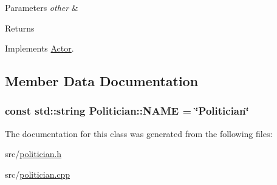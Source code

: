 \begin{DoxyParams}{Parameters}
{\em other} & \\
\hline
\end{DoxyParams}
\begin{DoxyReturn}{Returns}

\end{DoxyReturn}


Implements \hyperlink{classActor_a1595ffb3d753120a9e74eac0bd69adf1}{Actor}.



\subsection{Member Data Documentation}
\subsubsection[{\texorpdfstring{N\+A\+ME}{NAME}}]{\setlength{\rightskip}{0pt plus 5cm}const std\+::string Politician\+::\+N\+A\+ME = \char`\"{}Politician\char`\"{}\hspace{0.3cm}{\ttfamily [static]}}\hypertarget{classPolitician_a9092b26f16fe1c7b5f88a007ff62db82}{}\label{classPolitician_a9092b26f16fe1c7b5f88a007ff62db82}


The documentation for this class was generated from the following files\+:\begin{DoxyCompactItemize}
\item 
src/\hyperlink{politician_8h}{politician.\+h}\item 
src/\hyperlink{politician_8cpp}{politician.\+cpp}\end{DoxyCompactItemize}
